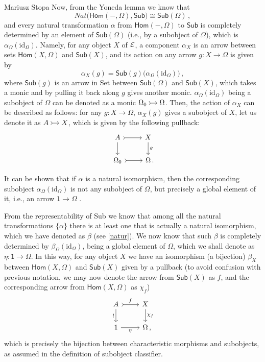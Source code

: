 \begin{artengenv}{Mariusz Stopa}
Now, from the Yoneda lemma we know that
\[
Nat \big( \textsf{Hom}(-,\Omega), \textsf{Sub}  \big) \cong \textsf{Sub} (\Omega)\,,
\]
and every natural transformation $ \alpha $ from $ \textsf{Hom}(-,\Omega) $ to $ \textsf{Sub} $ is completely determined by an element of $ \textsf{Sub} (\Omega) $ (i.e., by a subobject of $ \Omega $), which is $ \alpha_\Omega(\text{id}_\Omega) $. Namely, for any object $ X $ of $ \mathcal{E} $, a component $ \alpha_X $ is an arrow between sets $ \textsf{Hom}(X,\Omega) $ and $\textsf{Sub} (X) $, and its action on any arrow $ g:X\to\Omega $ is given by
\[
\alpha_X (g)=\textsf{Sub}(g)\big(\alpha_\Omega (\text{id}_\Omega)\big)\,,
\]
where $ \textsf{Sub}(g) $ is an arrow in \textsf{Set} between $ \textsf{Sub}(\Omega) $ and $ \textsf{Sub}(X) $, which takes a monic and by pulling it back along $ g $ gives another monic. $ \alpha_\Omega (\text{id}_\Omega) $ being a subobject of $ \Omega $ can be denoted as a monic $\begin{tikzcd}[cramped, sep=small] \Omega_0 \ar[r, tail]  & \Omega \end{tikzcd}$. Then, the action of $ \alpha_X $ can be described as follows: for any $ g:X\to\Omega $, $ \alpha_X (g) $ gives a subobject of $ X $, let us denote it as $\begin{tikzcd}[cramped, sep=small] A \ar[r, tail]  & X \end{tikzcd}$, which is given by the following pullback:
\[\begin{tikzcd} 
A \arrow[r, tail] \arrow[d]    & X \arrow[d, "g"] \\
\Omega_0 \arrow[r, tail] & \Omega \nospacepunct{.}
\end{tikzcd}
\]

It can be shown that if $ \alpha $ is a natural isomorphism, then the corresponding subobject $ \alpha_\Omega (\text{id}_\Omega) $ is not any subobject of $ \Omega $, but precisely a global element of it, i.e., an arrow $ \textsf{1}\to\Omega $  \parencite[see e.g.][part of the proof on p.33f]{maclane-moerdijk-1994}. 

From the representability of \textsf{Sub} we know that among all the natural transformations $ \{\alpha\} $ there is at least one that is actually a natural isomorphism, which we have denoted as $ \beta $ (see \eqref{natur}). We now know that such $ \beta $ is completely determined by $ \beta_\Omega (\text{id}_\Omega) $, being a global element of $ \Omega $, which we shall denote as $ \eta:\textsf{1}\to\Omega $. In this way, for any object $ X $ we have an isomorphism (a bijection) $ \beta_X $ between $ \textsf{Hom}(X,\Omega) $ and $ \textsf{Sub}(X) $ given by a pullback (to avoid confusion with previous notation, we may now denote the arrow from $ \textsf{Sub}(X) $ as $ f $, and the corresponding arrow from $ \textsf{Hom}(X,\Omega) $ as $ \chi_f $)
\[\begin{tikzcd} 
A \arrow[r, tail, "f"] \arrow[d, "!"']    & X \arrow[d, "\chi_f"] \\
\textsf{1} \arrow[r, "\eta"'] & \Omega\nospacepunct{,}
\end{tikzcd}
\]
which is precisely the bijection between characteristic morphisms and subobjects, as assumed in the definition of subobject classifier.


\end{artengenv}
